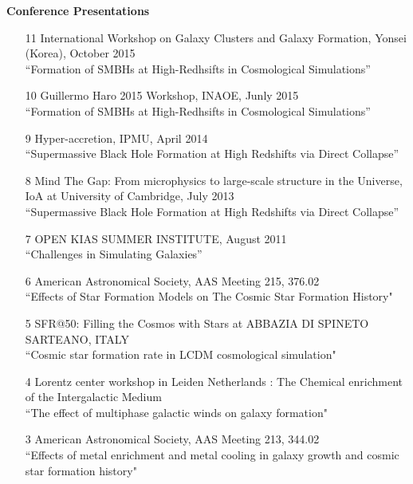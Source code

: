 \documentclass [11pt]{article}
\begin{document}
{{\begin{enumerate}
\end{enumerate}


\noindent
{\textbf{Conference Presentations}}
\begin{enumerate}

\item[11] International Workshop on Galaxy Clusters and Galaxy Formation, Yonsei (Korea), October 2015\\ ``Formation of SMBHs at High-Redhsifts in Cosmological Simulations''

\item[10] Guillermo Haro 2015 Workshop, INAOE, Junly 2015\\ ``Formation of SMBHs at High-Redhsifts in Cosmological Simulations''

\item[9] Hyper-accretion, IPMU, April 2014\\ ``Supermassive Black Hole Formation at High Redshifts via Direct Collapse''

\item[8] Mind The Gap: From microphysics to large-scale structure in the Universe, IoA at University of Cambridge, July 2013\\ ``Supermassive Black Hole Formation at High Redshifts via Direct Collapse''

\item[7] OPEN KIAS SUMMER INSTITUTE, August 2011\\ ``Challenges in Simulating Galaxies''

\item[6] American Astronomical Society, AAS Meeting 215, 376.02 \\ ``Effects of Star Formation Models on The Cosmic Star Formation History"

\item[5] SFR@50: Filling the Cosmos with Stars at ABBAZIA DI SPINETO SARTEANO, ITALY \\ ``Cosmic star formation rate in LCDM cosmological simulation"

\item[4] Lorentz center workshop in Leiden Netherlands : The Chemical enrichment of the Intergalactic Medium \\ ``The effect of multiphase galactic winds on galaxy formation"

\item[3] American Astronomical Society, AAS Meeting 213, 344.02 \\ ``Effects of metal enrichment and metal cooling in galaxy growth and cosmic star formation history"


\end{enumerate}}}
\end{document}
